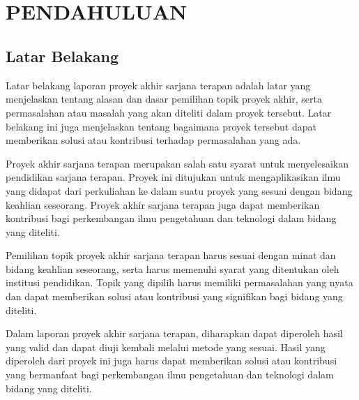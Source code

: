 
\chapter[PENDAHULUAN]{\\ PENDAHULUAN}

\section{Latar Belakang}
Latar belakang laporan proyek akhir sarjana terapan adalah latar yang menjelaskan tentang alasan dan dasar pemilihan topik proyek akhir, serta permasalahan atau masalah yang akan diteliti dalam proyek tersebut. Latar belakang ini juga menjelaskan tentang bagaimana proyek tersebut dapat memberikan solusi atau kontribusi terhadap permasalahan yang ada.

Proyek akhir sarjana terapan merupakan salah satu syarat untuk menyelesaikan pendidikan sarjana terapan. Proyek ini ditujukan untuk mengaplikasikan ilmu yang didapat dari perkuliahan ke dalam suatu proyek yang sesuai dengan bidang keahlian seseorang. Proyek akhir sarjana terapan juga dapat memberikan kontribusi bagi perkembangan ilmu pengetahuan dan teknologi dalam bidang yang diteliti.

Pemilihan topik proyek akhir sarjana terapan harus sesuai dengan minat dan bidang keahlian seseorang, serta harus memenuhi syarat yang ditentukan oleh institusi pendidikan. Topik yang dipilih harus memiliki permasalahan yang nyata dan dapat memberikan solusi atau kontribusi yang signifikan bagi bidang yang diteliti.

Dalam laporan proyek akhir sarjana terapan, diharapkan dapat diperoleh hasil yang valid dan dapat diuji kembali melalui metode yang sesuai. Hasil yang diperoleh dari proyek ini juga harus dapat memberikan solusi atau kontribusi yang bermanfaat bagi perkembangan ilmu pengetahuan dan teknologi dalam bidang yang diteliti.

